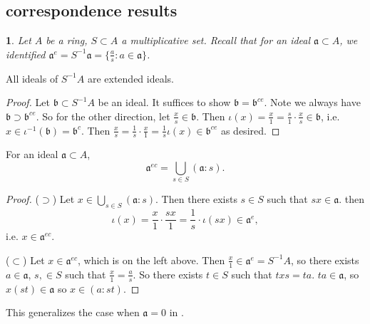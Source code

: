 \documentclass[12pt]{article}
\newtheorem{para}[theorem]{}
\begin{document}

\subsection{correspondence results} %

\begin{para}
	Let $A$ be a ring, $S\subset A$ a multiplicative set. Recall that for an ideal $\mathfrak{a}\subset A$, we identified $\mathfrak{a}^e=S^{-1}\mathfrak{a}=\{\frac{a}{s}:a\in\mathfrak{a}\}$.
\end{para}

\begin{proposition}
	All ideals of $S^{-1}A$ are extended ideals.
\end{proposition}
\begin{proof}
	Let $\mathfrak{b}\subset S^{-1}A$ be an ideal. It suffices to show $\mathfrak{b}=\mathfrak{b}^{ce}$. Note we always have $\mathfrak{b}\supset\mathfrak{b}^{ce}$. So for the other direction, let $\frac{x}{s}\in\mathfrak{b}$. Then $\iota(x)=\frac{x}{1} = \frac{s}{1}\cdot \frac{x}{s}\in\mathfrak{b}$, i.e. $x\in\iota^{-1}(\mathfrak{b})=\mathfrak{b}^c$. Then $\frac{x}{s}=\frac{1}{s}\cdot\frac{x}{1}=\frac{1}{s}\iota(x)\in\mathfrak{b}^{ce}$ as desired.
\end{proof}

\begin{proposition}
	For an ideal $\mathfrak{a}\subset A$, 
	\begin{equation*}
		\mathfrak{a}^{ec}=\bigcup_{s\in S}(\mathfrak{a}:s).
	\end{equation*}
\end{proposition}
\begin{proof}
	($\supset$) Let $x\in\bigcup_{s\in S}(\mathfrak{a}:s)$. Then there exists $s\in S$ such that $sx\in\mathfrak{a}$. then 
		\begin{equation*}
			\iota(x)=\frac{x}{1}\cdot\frac{sx}{1}=\frac{1}{s}\cdot\iota(sx)\in\mathfrak{a}^e, 
		\end{equation*}
		i.e. $x\in\mathfrak{a}^{ec}$.

		($\subset$) Let $x\in\mathfrak{a}^{ec}$, which is on the left above. Then $\frac{x}{1}\in\mathfrak{a}^e=S^{-1}A$, so there exists $a\in\mathfrak{a}$, $s,\in S$ such that $\frac{x}{1}=\frac{a}{s}$. So there exists $t\in S$ such that $txs=ta$. $ta\in\mathfrak{a}$, so $x(st)\in\mathfrak{a}$ so $x\in(a:st)$.
\end{proof}

\begin{remark}
	This generalizes the case when $\mathfrak{a}=0$ in .
\end{remark}
\end{document}
